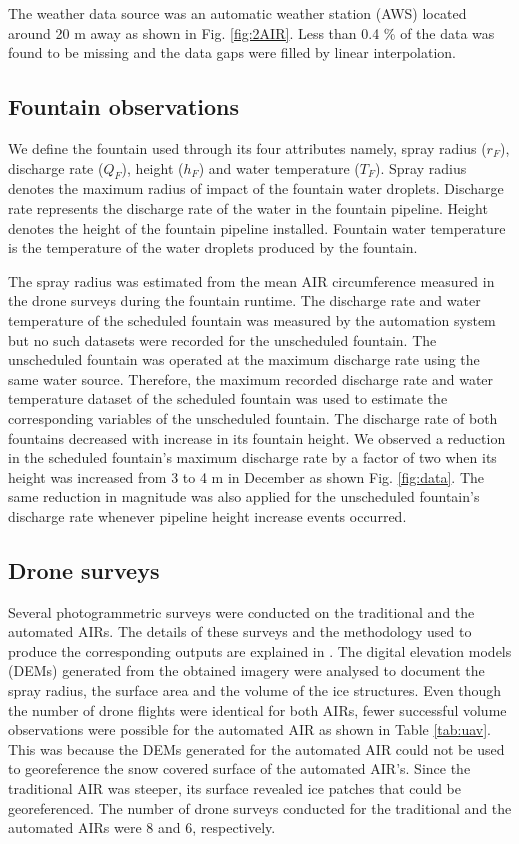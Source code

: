 \documentclass[tc, manuscript]{copernicus}
\begin{document}
The weather data source was an automatic weather station (AWS) located around 20 m away as shown in Fig.
\ref{fig:2AIR}. Less than 0.4 \% of the data was found to be missing and the data gaps were filled by linear
interpolation. 

\subsection{Fountain observations}

We define the fountain used through its four attributes namely, spray radius ($r_F$), discharge rate ($Q_F$),
height ($h_F$) and water temperature ($T_F$). Spray radius denotes the maximum radius of impact of the fountain
water droplets. Discharge rate represents the discharge rate of the water in the fountain pipeline. Height
denotes the height of the fountain pipeline installed. Fountain water temperature is the temperature of the
water droplets produced by the fountain.

The spray radius was estimated from the mean AIR circumference measured in the drone surveys during the fountain
runtime. The discharge rate and water temperature of the scheduled fountain was measured by the automation
system but no such datasets were recorded for the unscheduled fountain. The unscheduled fountain was operated at
the maximum discharge rate using the same water source. Therefore, the maximum recorded discharge rate and water
temperature dataset of the scheduled fountain was used to estimate the corresponding variables of the
unscheduled fountain. The discharge rate of both fountains decreased with increase in its fountain height. We
observed a reduction in the scheduled fountain's maximum discharge rate by a factor of two when its height was
increased from 3 to 4 m in December as shown Fig. \ref{fig:data}. The same reduction in magnitude was also
applied for the unscheduled fountain's discharge rate whenever pipeline height increase events occurred. 

\subsection{Drone surveys}

Several photogrammetric surveys were conducted on the traditional and the automated AIRs. The details of these
surveys and the methodology used to produce the corresponding outputs are explained in
\cite{balasubramanianInfluenceMeteorologicalConditions2022}. The digital elevation models (DEMs) generated from
the obtained imagery were analysed to document the spray radius, the surface area and the volume of the ice
structures. Even though the number of drone flights were identical for both AIRs, fewer successful volume
observations were possible for the automated AIR as shown in Table \ref{tab:uav}. This was because the DEMs
generated for the automated AIR could not be used to georeference the snow covered surface of the automated AIR's. Since the
traditional AIR was steeper, its surface revealed ice patches that could be georeferenced. The number of drone
surveys conducted for the traditional and the automated AIRs were 8 and 6, respectively. 
\end{document}

